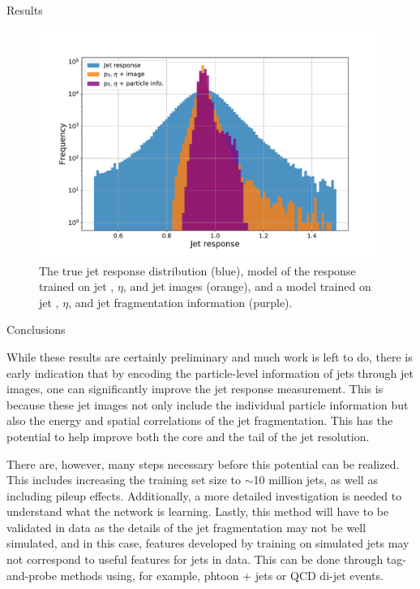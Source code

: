 \begin{section}{Results}
\begin{figure}[tbp!]
\begin{center}
\includegraphics[angle=0,width=0.80\columnwidth]{fig/dnn_prediction.pdf}
\end{center}
\caption{The true jet response distribution (blue), model of the response trained on jet \pT, $\eta$, and jet images (orange), and a model trained on jet \pT, $\eta$, and jet fragmentation information (purple).}
\label{fig:dnn_prediction}
\end{figure}

\end{section}

\begin{section}{Conclusions}

While these results are certainly preliminary and much work is left to do, there is early indication that by encoding the particle-level information of jets through jet images, one can significantly improve the jet response measurement.
This is because these jet images not only include the individual particle information but also the energy and spatial correlations of the jet fragmentation.
This has the potential to help improve both the core and the tail of the jet resolution.

There are, however, many steps necessary before this potential can be realized.
This includes increasing the training set size to $\sim$10 million jets, as well as including pileup effects.
Additionally, a more detailed investigation is needed to understand what the network is learning.
Lastly, this method will have to be validated in data as the details of the jet fragmentation may not be well simulated, and in this case, features developed by training on simulated jets may not correspond to useful features for jets in data.
This can be done through tag-and-probe methods using, for example, phtoon + jets or QCD di-jet events.

\end{section}
